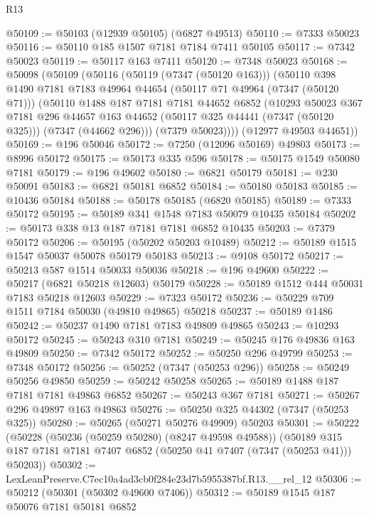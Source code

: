 \begin{lexlean}{R13}
\begin{coremodule}
@50109 := @50103 (@12939 @50105) (@6827 @49513)
@50110 := @7333 @50023
@50116 := @50110 @185 @1507 @7181 @7184 @7411 @50105
@50117 := @7342 @50023
@50119 := @50117 @163 @7411
@50120 := @7348 @50023
@50168 := @50098
    (@50109
      (@50116
        (@50119 (@7347 (@50120 @163)))
        (@50110
          @398
          @1490
          @7181
          @7183
          @49964
          @44654
          (@50117 @71 @49964 (@7347 (@50120 @71)))
          (@50110
            @1488
            @187
            @7181
            @7181
            @44652
            @6852
            (@10293
              @50023
              @367
              @7181
              @296
              @44657
              @163
              @44652
              (@50117 @325 @44441 (@7347 (@50120 @325)))
              (@7347 (@44662 @296)))
            (@7379 @50023))))
      (@12977 @49503 @44651))
@50169 := @196 @50046
@50172 := @7250 (@12096 @50169) @49803
@50173 := @8996 @50172
@50175 := @50173 @335 @596
@50178 := @50175 @1549 @50080 @7181
@50179 := @196 @49602
@50180 := @6821 @50179
@50181 := @230 @50091
@50183 := @6821 @50181 @6852
@50184 := @50180 @50183
@50185 := @10436 @50184
@50188 := @50178 @50185 (@6820 @50185)
@50189 := @7333 @50172
@50195 := @50189 @341 @1548 @7183 @50079 @10435 @50184
@50202 := @50173 @338 @13 @187 @7181 @7181 @6852 @10435
@50203 := @7379 @50172
@50206 := @50195 (@50202 @50203 @10489)
@50212 := @50189 @1515 @1547 @50037 @50078 @50179 @50183
@50213 := @9108 @50172
@50217 := @50213 @587 @1514 @50033 @50036
@50218 := @196 @49600
@50222 := @50217 (@6821 @50218 @12603) @50179
@50228 := @50189 @1512 @444 @50031 @7183 @50218 @12603
@50229 := @7323 @50172
@50236 := @50229 @709 @1511 @7184 @50030 (@49810 @49865) @50218
@50237 := @50189 @1486
@50242 := @50237 @1490 @7181 @7183 @49809 @49865
@50243 := @10293 @50172
@50245 := @50243 @310 @7181
@50249 := @50245 @176 @49836 @163 @49809
@50250 := @7342 @50172
@50252 := @50250 @296 @49799
@50253 := @7348 @50172
@50256 := @50252 (@7347 (@50253 @296))
@50258 := @50249 @50256 @49850
@50259 := @50242 @50258
@50265 := @50189 @1488 @187 @7181 @7181 @49863 @6852
@50267 := @50243 @367 @7181
@50271 := @50267 @296 @49897 @163 @49863
@50276 := @50250 @325 @44302 (@7347 (@50253 @325))
@50280 := @50265 (@50271 @50276 @49909) @50203
@50301 := @50222
    (@50228
      (@50236 (@50259 @50280) (@8247 @49598 @49588))
      (@50189 @315 @187 @7181 @7181 @7407 @6852 (@50250 @41 @7407 (@7347 (@50253 @41))) @50203))
@50302 := LexLeanPreserve.C7ec10a4ad3cb0f284e23d7b5955387bf.R13.__rel_12
@50306 := @50212 (@50301 (@50302 @49600 @7406))
@50312 := @50189 @1545 @187 @50076 @7181 @50181 @6852

\end{coremodule}
\end{lexlean}
